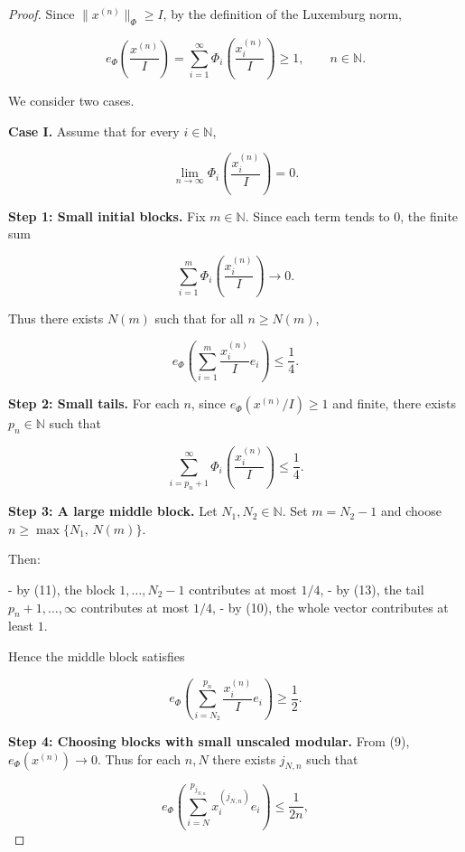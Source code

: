 \documentclass[10pt,a4paper]{amsart}
\begin{document}
\begin{proof}
{%
Since $\|x^{(n)}\|_\Phi \ge I$, by the definition of the Luxemburg norm,


\[
e_\Phi\!\left(\frac{x^{(n)}}{I}\right)
= \sum_{i=1}^\infty \Phi_i\!\left(\frac{x^{(n)}_i}{I}\right)
\ge 1,
\qquad n\in\mathbb N.
\tag{10}
\]



We consider two cases.

\medskip
\noindent
\textbf{Case I.}  
Assume that for every $i\in\mathbb N$,


\[
\lim_{n\to\infty}
\Phi_i\!\left(\frac{x^{(n)}_i}{I}\right) = 0.
\]



\medskip
\textbf{Step 1: Small initial blocks.}
Fix $m\in\mathbb N$.  
Since each term tends to $0$, the finite sum


\[
\sum_{i=1}^m \Phi_i\!\left(\frac{x^{(n)}_i}{I}\right)
\to 0.
\]


Thus there exists $N(m)$ such that for all $n\ge N(m)$,


\[
e_\Phi\!\left(\sum_{i=1}^m \frac{x^{(n)}_i}{I} e_i\right)
\le \frac14.
\tag{11}
\]



\medskip
\textbf{Step 2: Small tails.}
For each $n$, since $e_\Phi(x^{(n)}/I)\ge 1$ and finite,  
there exists $p_n\in\mathbb N$ such that


\[
\sum_{i=p_n+1}^\infty 
\Phi_i\!\left(\frac{x^{(n)}_i}{I}\right)
\le \frac14.
\tag{13}
\]



\medskip
\textbf{Step 3: A large middle block.}
Let $N_1,N_2\in\mathbb N$.  
Set $m=N_2-1$ and choose $n\ge \max\{N_1,\,N(m)\}$.

Then:

- by (11), the block $1,\dots,N_2-1$ contributes at most $1/4$,
- by (13), the tail $p_n+1,\dots,\infty$ contributes at most $1/4$,
- by (10), the whole vector contributes at least $1$.

Hence the middle block satisfies


\[
e_\Phi\!\left(\sum_{i=N_2}^{p_n} \frac{x^{(n)}_i}{I} e_i\right)
\ge \frac12.
\tag{14}
\]



\medskip
\textbf{Step 4: Choosing blocks with small unscaled modular.}
From (9), $e_\Phi(x^{(n)})\to 0$.  
Thus for each $n,N$ there exists $j_{N,n}$ such that


\[
e_\Phi\!\left(\sum_{i=N}^{p_{j_{N,n}}} x^{(j_{N,n})}_i e_i\right)
\le \frac{1}{2n},
\]


}
\end{proof}
\end{document}
